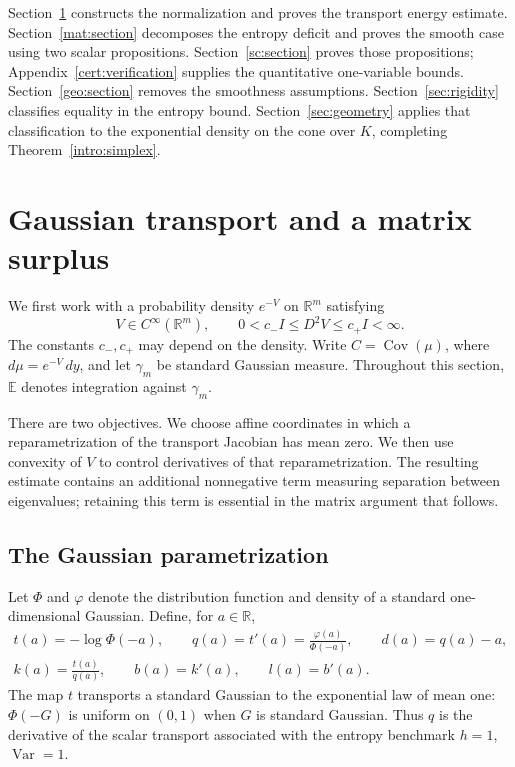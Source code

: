 \documentclass[11pt]{article}
\theoremstyle{definition}
\theoremstyle{remark}
\numberwithin{equation}{section}
\begin{document}
Section~\ref{tr:section} constructs the normalization and proves the
transport energy estimate.  Section~\ref{mat:section} decomposes the
entropy deficit and proves the smooth case using two scalar
propositions.  Section~\ref{sc:section} proves those propositions;
Appendix~\ref{cert:verification} supplies the quantitative one-variable
bounds.  Section~\ref{geo:section} removes the smoothness assumptions.
Section~\ref{sec:rigidity} classifies equality in the entropy bound.
Section~\ref{sec:geometry} applies that classification to the exponential
density on the cone over $K$, completing Theorem~\ref{intro:simplex}.

\section{Gaussian transport and a matrix surplus}\label{tr:section}

We first work with a probability density $e^{-V}$ on $\mathbb R^m$ satisfying
\begin{equation}\label{tr:smooth-assumptions}
 V\in C^\infty(\mathbb R^m),\qquad
 0<c_- I\le D^2V\le c_+I<\infty.
\end{equation}
The constants $c_-,c_+$ may depend on the density.  Write
$C=\operatorname{Cov}(\mu)$, where $d\mu=e^{-V}\,dy$, and let
$\gamma_m$ be standard Gaussian measure.  Throughout this section,
$\mathbb E$ denotes integration against $\gamma_m$.

There are two objectives.  We choose affine coordinates in which a
reparametrization of the transport Jacobian has mean zero.  We then use
convexity of $V$ to control derivatives of that reparametrization.  The
resulting estimate contains an additional nonnegative term measuring
separation between eigenvalues; retaining this term is essential in the
matrix argument that follows.

\subsection{The Gaussian parametrization}

Let $\Phi$ and $\varphi$ denote the distribution function and density of a
standard one-dimensional Gaussian.  Define, for $a\in\mathbb R$,
\begin{equation}\label{tr:scalar-functions}
 \begin{gathered}
 t(a)=-\log\Phi(-a),\qquad q(a)=t'(a)=\frac{\varphi(a)}{\Phi(-a)},
 \qquad d(a)=q(a)-a,\\
 k(a)=\frac{t(a)}{q(a)},\qquad b(a)=k'(a),\qquad l(a)=b'(a).
 \end{gathered}
\end{equation}
The map $t$ transports a standard Gaussian to the exponential law of
mean one: $\Phi(-G)$ is uniform on $(0,1)$ when $G$ is standard Gaussian.
Thus $q$ is the derivative of the scalar transport associated with the
entropy benchmark $h=1$, $\operatorname{Var}=1$.
\end{document}
